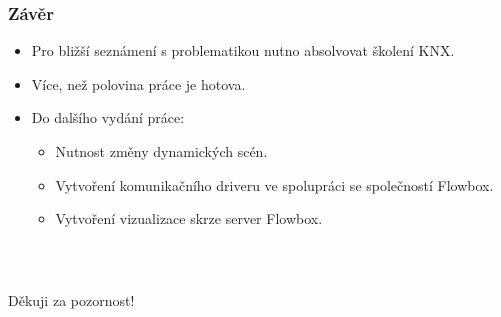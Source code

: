 \documentclass[%
  12pt,       				%
	t,                  %
	aspectratio=1610,   %
	unicode,						%
]{beamer}				    	%
\begin{document}
\begin{frame} 
	\frametitle{Závěr}
\begin{itemize}
    \item Pro bližší seznámení s problematikou nutno absolvovat školení KNX.
    \item Více, než polovina práce je hotova.
    \item Do dalšího vydání práce:
        \begin{itemize}
            \item Nutnost změny dynamických scén.
            \item Vytvoření komunikačního driveru ve spolupráci se společností Flowbox.
            \item Vytvoření vizualizace skrze server Flowbox.
        \end{itemize}
\end{itemize}
\end{frame}


\begin{frame}[c] 
	\frametitle{\mbox{ }}
	\begin{center}
		{\Huge Děkuji za pozornost!}
	\end{center}
\end{frame}

\end{document}
